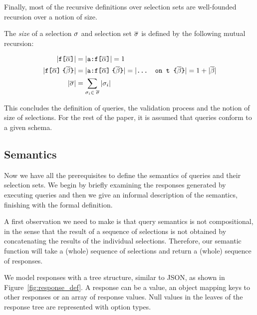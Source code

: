 Finally, most of the recursive definitions over selection sets are well-founded recursion over a notion of size.
\begin{definition}
The \emph{size} of a selection $\sigma$ and selection set $\overline{\sigma}$ is defined by the following mutual recursion:

\begin{align*}
    \lvert \texttt{f[}\overline{\alpha}\texttt{]} \rvert & = \lvert \texttt{a:}\texttt{f[}\overline{\alpha}\texttt{]} \rvert =  1\\
    \lvert \texttt{f[}\overline{\alpha}\texttt{]}\; \texttt{\{}\overline{\beta}\texttt{\}} \rvert &= \lvert \texttt{a:}\texttt{f[}\overline{\alpha}\texttt{]}\; \texttt{\{}\overline{\beta}\texttt{\}} \rvert = \lvert \texttt{... on t \{}\overline{\beta}\texttt{\}} \rvert = 1 + \lvert \overline{\beta} \rvert\\
    \lvert \overline{\sigma} \rvert &= \sum_{\sigma_{i} \in\; \overline{\sigma}}{\lvert \sigma_{i} \rvert}
    \end{align*}
\end{definition} 

This concludes the definition of \gql queries, the validation process and the notion of size of selections. For the rest of the paper, it is assumed that queries conform to a given schema. 

\subsection{Semantics}\label{subsec:semantics}
Now we have all the prerequisites to define the semantics of \gql queries and their selection sets. We begin by briefly examining the responses generated by executing queries and then we give an informal description of the semantics, finishing with the formal definition. %

A first observation we need to make is that query semantics is not compositional, in the sense that the result of a sequence of selections is not obtained by concatenating the results of the individual selections. Therefore, our semantic function will take a (whole) sequence of selections and return a (whole) sequence of responses.  

We model responses with a tree structure, similar to JSON, as shown in Figure~\ref{fig:response_def}. A response can be a value, an object mapping keys to other responses or an array of response values. Null values in the leaves of the response tree are represented with option types.%


